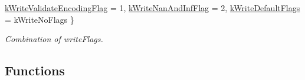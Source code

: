 \begin{DoxyCompactItemize}
\mbox{\hyperlink{namespacerapidjson_ad28b1de6aee37e92fc31792dd6dd6b19ac1b5e17278b060e9e866df075c104c10}{k\+Write\+Validate\+Encoding\+Flag}} = 1, 
\mbox{\hyperlink{namespacerapidjson_ad28b1de6aee37e92fc31792dd6dd6b19a3adbca1d31ad845ff4e9d742280cce39}{k\+Write\+Nan\+And\+Inf\+Flag}} = 2, 
\mbox{\hyperlink{namespacerapidjson_ad28b1de6aee37e92fc31792dd6dd6b19a5b5ca665afdfa828a74ae5755c67a226}{k\+Write\+Default\+Flags}} = k\+Write\+No\+Flags
 \}
\begin{DoxyCompactList}\small\item\em Combination of write\+Flags. \end{DoxyCompactList}\end{DoxyCompactItemize}
\subsection*{Functions}
